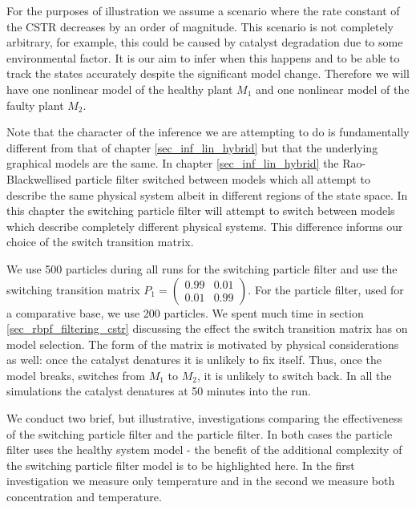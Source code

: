 For the purposes of illustration we assume a scenario where the rate constant of the CSTR decreases by an order of magnitude. This scenario is not completely arbitrary, for example, this could be caused by catalyst degradation due to some environmental factor. It is our aim to infer when this happens and to be able to track the states accurately despite the significant model change. Therefore we will have one nonlinear model of the healthy plant $M_1$ and one nonlinear model of the faulty plant $M_2$.

Note that the character of the inference we are attempting to do is fundamentally different from that of chapter \ref{sec_inf_lin_hybrid} but that the underlying graphical models are the same. In chapter \ref{sec_inf_lin_hybrid} the Rao-Blackwellised particle filter switched between models which all attempt to describe the same physical system albeit in different regions of the state space. In this chapter the switching particle filter will attempt to switch between models which describe completely different physical systems. This difference informs our choice of the switch transition matrix.

We use 500 particles during all runs for the switching particle filter and use the switching transition matrix $P_1=\begin{pmatrix}
0.99 & 0.01 \\ 0.01 & 0.99
\end{pmatrix}$. For the particle filter, used for a comparative base, we use 200 particles. We spent much time in section \ref{sec_rbpf_filtering_cstr} discussing the effect the switch transition matrix has on model selection. The form of the matrix is motivated by physical considerations as well: once the catalyst denatures it is unlikely to fix itself. Thus, once the model breaks, switches from $M_1$ to $M_2$, it is unlikely to switch back. In all the simulations the catalyst denatures at 50 minutes into the run.

We conduct two brief, but illustrative, investigations comparing the effectiveness of the switching particle filter and the particle filter. In both cases the particle filter uses the healthy system model - the benefit of the additional complexity of the switching particle filter model is to be highlighted here. In the first investigation we measure only temperature and in the second we measure both concentration and temperature. 

